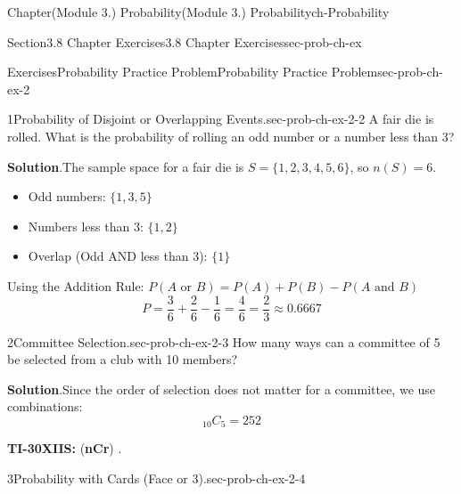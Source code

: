 \documentclass[oneside,10pt,]{book}
\newcommand{\blocktitlefont}{\relax}
\newcommand{\ptxlistdisc}{\raisebox{0.3ex}{\textbullet}}
\newcommand{\terminology}[1]{\textbf{#1}}
\newcommand{\kbd}[1]{\keys{{#1}}}
\begin{document}
\begin{chapterptx}{Chapter}{(Module 3.) Probability}{}{(Module 3.) Probability}{}{}{ch-Probability}
%
%
\typeout{************************************************}
\typeout{************************************************}
%
\begin{sectionptx}{Section}{3.8 Chapter Exercises}{}{3.8 Chapter Exercises}{}{}{sec-prob-ch-ex}
%
%
\typeout{************************************************}
\typeout{************************************************}
%
\begin{exercises-subsection-numberless}{Exercises}{Probability Practice Problem}{}{Probability Practice Problem}{}{}{sec-prob-ch-ex-2}
\begin{divisionexercise}{1}{Probability of Disjoint or Overlapping Events.}{}{sec-prob-ch-ex-2-2}%
A fair die is rolled. What is the probability of rolling an odd number or a number less than 3?%
\par\smallskip%
\noindent\textbf{\blocktitlefont Solution}.\hypertarget{sec-prob-ch-ex-2-2-3}{}\quad{}The sample space for a fair die is \(S = \{1, 2, 3, 4, 5, 6\}\), so \(n(S) = 6\).%
\begin{itemize}[label=\ptxlistdisc]
\item{}Odd numbers: \(\{1, 3, 5\}\)%
\item{}Numbers less than 3: \(\{1, 2\}\)%
\item{}Overlap (Odd AND less than 3): \(\{1\}\)%
\end{itemize}
Using the Addition Rule: \(P(A \text{ or } B) = P(A) + P(B) - P(A \text{ and } B)\)%
\begin{equation*}
P = \frac{3}{6} + \frac{2}{6} - \frac{1}{6} = \frac{4}{6} = \frac{2}{3} \approx 0.6667
\end{equation*}
%
\end{divisionexercise}%
\begin{divisionexercise}{2}{Committee Selection.}{}{sec-prob-ch-ex-2-3}%
How many ways can a committee of 5 be selected from a club with 10 members?%
\par\smallskip%
\noindent\textbf{\blocktitlefont Solution}.\hypertarget{sec-prob-ch-ex-2-3-3}{}\quad{}Since the order of selection does not matter for a committee, we use combinations:%
\begin{equation*}
{}_{10}C_{5} = 252
\end{equation*}
%
\par
\terminology{TI-30XIIS:} \kbd{10} \kbd{PRB} (\terminology{nCr}) \kbd{5} \kbd{ENTER}.%
\end{divisionexercise}%
\begin{divisionexercise}{3}{Probability with Cards (Face or 3).}{}{sec-prob-ch-ex-2-4}%

\end{divisionexercise}
\end{exercises-subsection-numberless}
\end{sectionptx}
\end{chapterptx}
\end{document}
